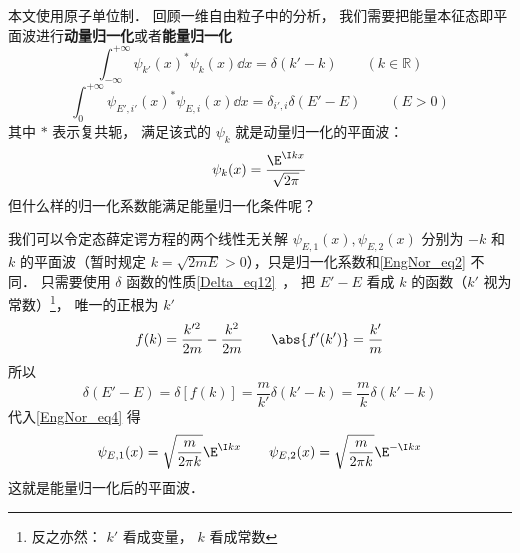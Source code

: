 
\begin{issues}
\issueDraft
\end{issues}


本文使用原子单位制． 回顾一维自由粒子中的分析， 我们需要把能量本征态即平面波进行\textbf{动量归一化}或者\textbf{能量归一化}%
\begin{equation}\label{EngNor_eq1}
\int_{-\infty}^{+\infty} \psi_{k'}(x)^* \psi_{k}(x) \dd{x} = \delta(k' - k) \qquad (k \in \mathbb R)
\end{equation}
\begin{equation}\label{EngNor_eq4}
\int_{0}^{+\infty} \psi_{E',i'}(x)^* \psi_{E,i}(x) \dd{x} = \delta_{i',i}\delta(E' - E) \qquad (E > 0)
\end{equation}
其中 $*$ 表示复共轭， 满足该式的 $\psi_k$ 就是动量归一化的平面波：%
\begin{equation}\label{EngNor_eq2}
\psi_k(x) = \frac{\E^{\I kx}}{\sqrt{2\pi}}
\end{equation}
但什么样的归一化系数能满足能量归一化条件呢？

我们可以令定态薛定谔方程的两个线性无关解 $\psi_{E,1}(x), \psi_{E,2}(x)$ 分别为 $-k$ 和 $k$ 的平面波（暂时规定 $k = \sqrt{2mE} > 0$），只是归一化系数和\autoref{EngNor_eq2} 不同． 只需要使用 $\delta$ 函数的性质\autoref{Delta_eq12}~， 把 $E'-E$ 看成 $k$ 的函数（$k'$ 视为常数）\footnote{反之亦然： $k'$ 看成变量， $k$ 看成常数}， 唯一的正根为 $k'$
\begin{equation}
f(k) = \frac{k'^2}{2m} - \frac{k^2}{2m}
\qquad
\abs{f'(k')} = \frac{k'}{m}
\end{equation}
所以
\begin{equation}
\delta(E'-E) = \delta[f(k)] = \frac{m}{k'} \delta(k'-k) = \frac{m}{k} \delta(k'-k)
\end{equation}
代入\autoref{EngNor_eq4} 得
\begin{equation}
\psi_{E,1}(x) = \sqrt{\frac{m}{2\pi k}}\E^{\I kx}
\qquad
\psi_{E,2}(x) = \sqrt{\frac{m}{2\pi k}}\E^{-\I kx}
\end{equation}
这就是能量归一化后的平面波．

